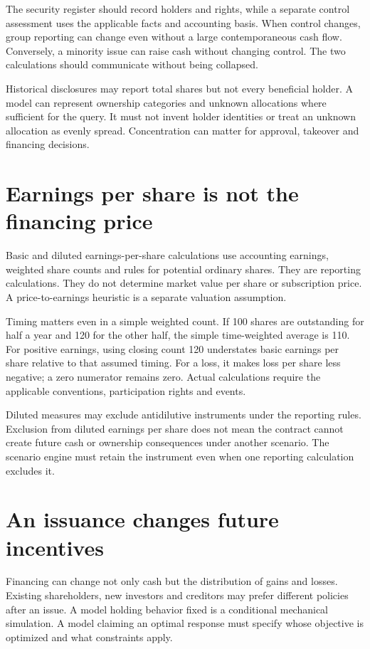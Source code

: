 The security register should record holders and rights, while a separate control assessment uses the applicable facts and accounting basis. When control changes, group reporting can change even without a large contemporaneous cash flow. Conversely, a minority issue can raise cash without changing control. The two calculations should communicate without being collapsed.

Historical disclosures may report total shares but not every beneficial holder. A model can represent ownership categories and unknown allocations where sufficient for the query. It must not invent holder identities or treat an unknown allocation as evenly spread. Concentration can matter for approval, takeover and financing decisions.

\section{Earnings per share is not the financing price}
Basic and diluted earnings-per-share calculations use accounting earnings, weighted share counts and rules for potential ordinary shares. They are reporting calculations. They do not determine market value per share or subscription price. A price-to-earnings heuristic is a separate valuation assumption.

Timing matters even in a simple weighted count. If 100 shares are outstanding for half a year and 120 for the other half, the simple time-weighted average is 110. For positive earnings, using closing count 120 understates basic earnings per share relative to that assumed timing. For a loss, it makes loss per share less negative; a zero numerator remains zero. Actual calculations require the applicable conventions, participation rights and events.

Diluted measures may exclude antidilutive instruments under the reporting rules. Exclusion from diluted earnings per share does not mean the contract cannot create future cash or ownership consequences under another scenario. The scenario engine must retain the instrument even when one reporting calculation excludes it.

\section{An issuance changes future incentives}
Financing can change not only cash but the distribution of gains and losses. Existing shareholders, new investors and creditors may prefer different policies after an issue. A model holding behavior fixed is a conditional mechanical simulation. A model claiming an optimal response must specify whose objective is optimized and what constraints apply.

